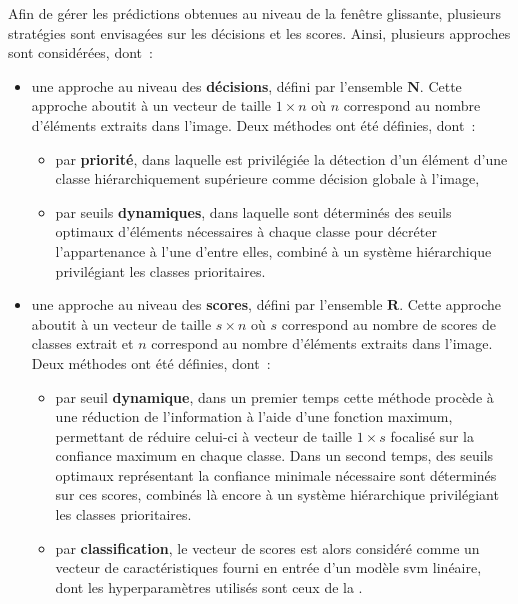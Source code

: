 Afin de gérer les prédictions obtenues au niveau de la fenêtre glissante, plusieurs stratégies sont envisagées sur les décisions et les scores. Ainsi, plusieurs approches sont considérées, dont~:
\begin{itemize}
    \item   une approche au niveau des \textbf{décisions}, défini par l'ensemble $\mathbf{N}$. Cette approche aboutit à un vecteur de taille $1 \times n$ où $n$ correspond au nombre d'éléments extraits dans l'image. Deux méthodes ont été définies, dont~:~
            \begin{itemize}
                \item par \textbf{priorité}, dans laquelle est privilégiée la détection d'un élément d'une classe hiérarchiquement supérieure comme décision globale à l'image,
                \item par seuils \textbf{dynamiques}, dans laquelle sont déterminés des seuils optimaux d'éléments nécessaires à chaque classe pour décréter l'appartenance à l'une d'entre elles, combiné à un système hiérarchique privilégiant les classes prioritaires.
            \end{itemize}
    \item   une approche au niveau des \textbf{scores}, défini par l'ensemble $\mathbf{R}$. Cette approche aboutit à un vecteur de taille $s \times n$ où $s$ correspond au nombre de scores de classes extrait et $n$ correspond au nombre d'éléments extraits dans l'image. Deux méthodes ont été définies, dont~:~
            \begin{itemize}
                \item par seuil \textbf{dynamique}, dans un premier temps cette méthode procède à une réduction de l'information à l'aide d'une fonction maximum, permettant de réduire celui-ci à vecteur de taille $1 \times s$ focalisé sur la confiance maximum en chaque classe. Dans un second temps, des seuils optimaux représentant la confiance minimale nécessaire sont déterminés sur ces scores, combinés là encore à un système hiérarchique privilégiant les classes prioritaires.
                \item par \textbf{classification}, le vecteur de scores est alors considéré comme un vecteur de caractéristiques fourni en entrée d'un modèle \gls{svm} linéaire, dont les hyperparamètres utilisés sont ceux de la .
            \end{itemize}
\end{itemize}\par

